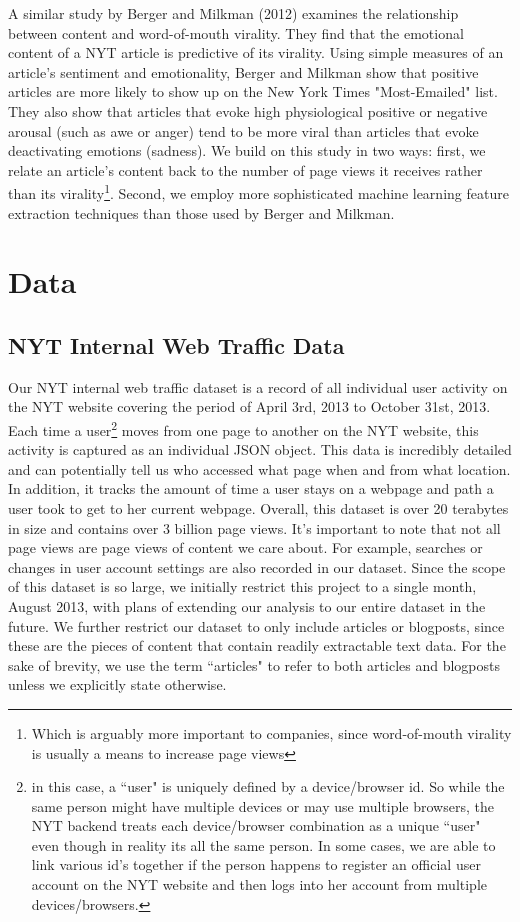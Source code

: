\documentclass[fleqn,12pt]{SelfArx} %
\begin{document}
A similar study by Berger and Milkman (2012) \cite{berger2012makes} examines the relationship between content and word-of-mouth virality. They find that the emotional content of a NYT article is predictive of its virality. Using simple measures of an article's sentiment and emotionality, Berger and Milkman show that positive articles are more likely to show up on the New York Times "Most-Emailed" list. They also show that articles that evoke high physiological positive or negative arousal (such as awe or anger) tend to be more viral than articles that evoke deactivating emotions (sadness). We build on this study in two ways: first, we relate an article's content back to the number of page views it receives rather than its virality\footnote{Which is arguably more important to companies, since word-of-mouth virality is usually a means to increase page views}. Second, we employ more sophisticated machine learning feature extraction techniques than those used by Berger and Milkman.

\section{Data}
\subsection{NYT Internal Web Traffic Data}
Our NYT internal web traffic dataset is a record of all individual user activity on the NYT website covering the period of April 3rd, 2013 to October 31st, 2013. Each time a user\footnote{in this case, a ``user" is uniquely defined by a device/browser id. So while the same person might have multiple devices or may use multiple browsers, the NYT backend treats each device/browser combination as a unique ``user" even though in reality its all the same person. In some cases, we are able to link various id's together if the person happens to register an official user account on the NYT website and then logs into her account from multiple devices/browsers.} moves from one page to another on the NYT website, this activity is captured as an individual JSON object. This data is incredibly detailed and can potentially tell us who accessed what page when and from what location. In addition, it tracks the amount of time a user stays on a webpage and path a user took to get to her current webpage. Overall, this dataset is over 20 terabytes in size and contains over 3 billion page views. It's important to note that not all page views are page views of content we care about. For example, searches or changes in user account settings are also recorded in our dataset. Since the scope of this dataset is so large, we initially restrict this project to a single month, August 2013, with plans of extending our analysis to our entire dataset in the future. We further restrict our dataset to only include articles or blogposts, since these are the pieces of content that contain readily extractable text data. For the sake of brevity, we use the term ``articles" to refer to both articles and blogposts unless we explicitly state otherwise. 
\end{document}
